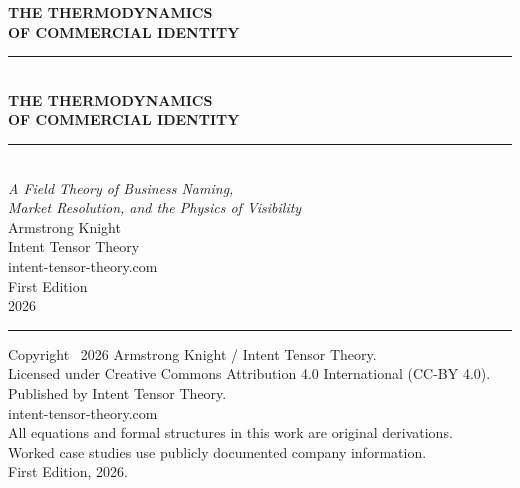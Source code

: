 \documentclass[12pt, openany]{book}
\theoremstyle{thmstyle}
\theoremstyle{defstyle}
\begin{document}
\thispagestyle{empty}
\vspace*{3in}
\begin{center}
{\Huge\bfseries\color{navy} THE THERMODYNAMICS\\[6pt] OF COMMERCIAL IDENTITY}
\end{center}
\newpage

\thispagestyle{empty}
\vspace*{1in}
\begin{center}
{\rule{\textwidth}{2pt}}\\[12pt]
{\Huge\bfseries\color{navy} THE THERMODYNAMICS\\[8pt] OF COMMERCIAL IDENTITY}\\[12pt]
{\rule{\textwidth}{0.6pt}}\\[20pt]
{\Large\color{midblue}\itshape A Field Theory of Business Naming,\\[4pt]
Market Resolution, and the Physics of Visibility}\\[40pt]
{\large\color{accentgray} Armstrong Knight}\\[8pt]
{\normalsize\color{accentgray} Intent Tensor Theory}\\[6pt]
{\normalsize\color{accentgray} intent-tensor-theory.com}\\[40pt]
{\small\color{accentgray} First Edition}\\[4pt]
{\small\color{accentgray} 2026}\\[30pt]
{\rule{\textwidth}{1pt}}
\end{center}
\newpage

\thispagestyle{empty}
\vspace*{4in}
{\small\color{accentgray}
\noindent Copyright \textcopyright\ 2026 Armstrong Knight / Intent Tensor Theory.\\[4pt]
Licensed under Creative Commons Attribution 4.0 International (CC-BY 4.0).\\[4pt]
Published by Intent Tensor Theory.\\
intent-tensor-theory.com\\[4pt]
All equations and formal structures in this work are original derivations.\\
Worked case studies use publicly documented company information.\\[4pt]
First Edition, 2026.
}
\newpage
\end{document}
